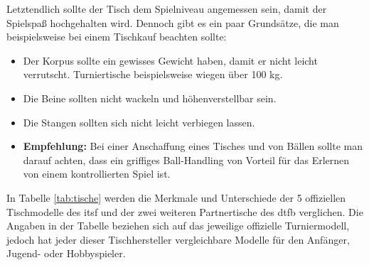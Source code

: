 Letztendlich sollte der Tisch dem Spielniveau angemessen sein, damit der Spielspaß hochgehalten wird. Dennoch gibt es ein paar Grundsätze, die man beispielsweise bei einem Tischkauf beachten sollte:
\begin{itemize}
\item Der Korpus sollte ein gewisses Gewicht haben, damit er nicht leicht verrutscht. Turniertische beispielsweise wiegen über 100 kg.
\item Die Beine sollten nicht wackeln und höhenverstellbar sein.
\item Die Stangen sollten sich nicht leicht verbiegen lassen.
\item {\bf Empfehlung:} Bei einer Anschaffung eines Tisches und von Bällen sollte man darauf achten, dass ein griffiges Ball-Handling von Vorteil für das Erlernen von einem kontrollierten Spiel ist.
\end{itemize}

In Tabelle \ref{tab:tische} werden die Merkmale und Unterschiede der 5 offiziellen Tischmodelle des \gls{itsf} und der zwei weiteren Partnertische des \gls{dtfb} verglichen. 
Die Angaben in der Tabelle beziehen sich auf das jeweilige offizielle Turniermodell, jedoch hat jeder dieser Tischhersteller vergleichbare Modelle für den Anfänger, Jugend- oder Hobbyspieler.    


